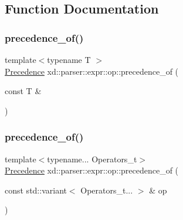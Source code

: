 \subsection{Function Documentation}
\mbox{\label{namespacexd_1_1parser_1_1expr_1_1op_a2734a883663419ac1509c376c26d33a8}} 
\subsubsection{\texorpdfstring{precedence\+\_\+of()}{precedence\_of()}\hspace{0.1cm}{\footnotesize\ttfamily [1/2]}}
{\footnotesize\ttfamily template$<$typename T $>$ \\
\mbox{\hyperlink{namespacexd_1_1parser_1_1expr_1_1op_ae27abd4a02cd8125663cb2bacac299b2}{Precedence}} xd\+::parser\+::expr\+::op\+::precedence\+\_\+of (\begin{DoxyParamCaption}\item[{const T \&}]{ }\end{DoxyParamCaption})}

\mbox{\label{namespacexd_1_1parser_1_1expr_1_1op_a5e23392eca2c04ab3946619f553be022}} 
\subsubsection{\texorpdfstring{precedence\+\_\+of()}{precedence\_of()}\hspace{0.1cm}{\footnotesize\ttfamily [2/2]}}
{\footnotesize\ttfamily template$<$typename... Operators\+\_\+t$>$ \\
\mbox{\hyperlink{namespacexd_1_1parser_1_1expr_1_1op_ae27abd4a02cd8125663cb2bacac299b2}{Precedence}} xd\+::parser\+::expr\+::op\+::precedence\+\_\+of (\begin{DoxyParamCaption}\item[{const std\+::variant$<$ Operators\+\_\+t... $>$ \&}]{op }\end{DoxyParamCaption})}

